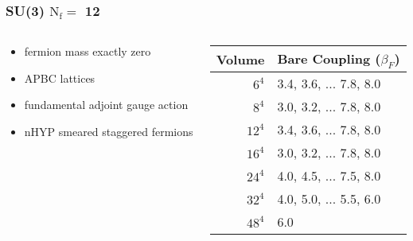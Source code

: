 \documentclass{beamer}
\begin{document}
  \begin{frame}
    \frametitle{SU(3) $\text{N}_{\text{f}}=$ 12}
    \begin{columns}[c]
      \begin{column}{0.5\textwidth}
        \begin{itemize}
          \item fermion mass exactly zero
          \item APBC lattices
          \item fundamental adjoint gauge action
          \item nHYP smeared staggered fermions
        \end{itemize}
      \end{column}
      \begin{column}{0.5\textwidth}
        \begin{tabular}{| r | l |}\hline
          Volume & Bare Coupling ($\beta_F$) \\\hline
          $6^4$  & 3.4, 3.6, ... 7.8, 8.0 \\
          $8^4$  & 3.0, 3.2, ... 7.8, 8.0 \\
          $12^4$ & 3.4, 3.6, ... 7.8, 8.0 \\
          $16^4$ & 3.0, 3.2, ... 7.8, 8.0 \\
          $24^4$ & 4.0, 4.5, ... 7.5, 8.0 \\
          $32^4$ & 4.0, 5.0, ... 5.5, 6.0 \\
          $48^4$ & 6.0 \\ \hline
        \end{tabular}
      \end{column}
    \end{columns}
  \end{frame}
\end{document}
